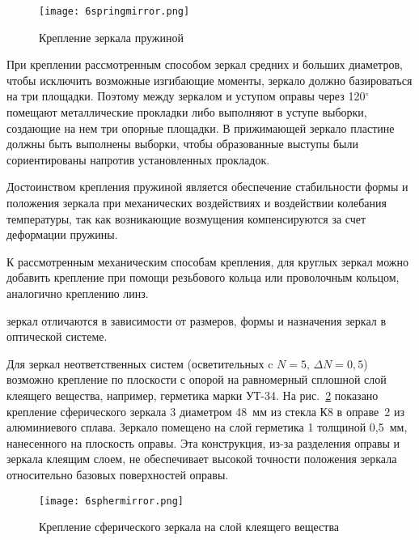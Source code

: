 \begin{figure}[h!]
	\begin{center}
		\texttt{[image: 6springmirror.png]}
		\caption{ Крепление зеркала пружиной }
		\label{pic:6springmirror}
	\end{center}
\end{figure}

При креплении рассмотренным способом зеркал средних и больших диаметров, чтобы исключить возможные изгибающие моменты, зеркало должно базироваться на три площадки. Поэтому между зеркалом и уступом оправы через 120$ ^\circ $ помещают металлические прокладки либо выполняют в уступе выборки, создающие на нем три опорные площадки. В прижимающей зеркало пластине должны быть выполнены выборки, чтобы образованные выступы были сориентированы напротив установленных прокладок.

Достоинством крепления пружиной является обеспечение стабильности формы и положения зеркала при механических воздействиях и воздействии колебания температуры, так как возникающие возмущения компенсируются за счет деформации пружины.

К рассмотренным механическим способам крепления, для круглых зеркал можно добавить крепление при помощи резьбового кольца или проволочным кольцом, аналогично креплению линз.

  зеркал отличаются в зависимости от размеров, формы и назначения зеркал в оптической системе.

Для зеркал неответственных систем (осветительных c $ N=5,\, \Delta N=0,5 $) возможно крепление по плоскости с опорой на равномерный сплошной слой клеящего вещества, например, герметика марки УТ-34. На рис.~\ref{pic:6sphermirror} показано крепление сферического зеркала 3 диаметром 48~мм из стекла К8 в оправе~2 из алюминиевого сплава. Зеркало помещено на слой герметика 1 толщиной 0,5~мм, нанесенного на плоскость оправы. Эта конструкция, из-за разделения оправы и зеркала клеящим слоем, не обеспечивает высокой точности положения зеркала относительно базовых поверхностей оправы. 

\begin{figure}[h!]
	\begin{center}
		\texttt{[image: 6sphermirror.png]}
		\caption{ Крепление сферического зеркала на слой клеящего вещества }
		\label{pic:6sphermirror}
	\end{center}
\end{figure}

